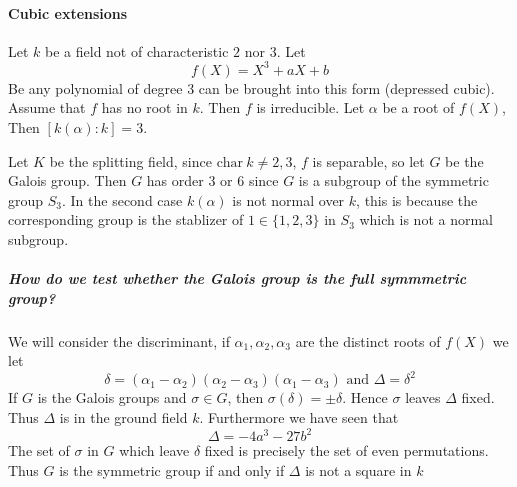   \paragraph*{Cubic extensions}
  \begin{example}
    Let $k$ be a field not of characteristic $2$ nor $3$. Let \[
      f(X) = X^3 + aX +b  
    \]
    Be any polynomial of degree $3$ can be brought into this form (depressed cubic). Assume that $f$ has no root in $k$. Then $f$ is irreducible. Let $\alpha$ be a root of $f(X)$, Then $[k(\alpha)\colon k] = 3$.

    Let $K$ be the splitting field, since $\text{char}~k\neq 2,3$, $f$ is separable, so let $G$ be the Galois group.
    Then $G$ has order $3$ or $6$ since $G$ is a subgroup of the symmetric group $S_3$. 
    In the second case $k(\alpha)$ is not normal over $k$, this is because the corresponding group is the stablizer of $1\in \{1,2,3\}$ in $S_3$ which is not a normal subgroup.%
    
    \subparagraph*{How do we test whether the Galois group is the full symmmetric group?}
    We will consider the discriminant, if $\alpha_1,\alpha_2,\alpha_3$ are the distinct roots of $f(X)$ we let\[
      \delta = (\alpha_1-\alpha_2)(\alpha_2-\alpha_3)(\alpha_1-\alpha_3) \text{ and }\Delta = \delta^2  
    \]
    If $G$ is the Galois groups and $\sigma\in G$, then $\sigma(\delta) = \pm \delta$. Hence $\sigma$ leaves $\Delta$ fixed. Thus $\Delta$ is in the ground field $k$. Furthermore we have seen that \[
      \Delta = -4a^3-27b^2  
    \]
  The set of $\sigma$ in $G$ which leave $\delta$ fixed is precisely the set of even permutations. Thus $G$ is the symmetric group if and only if $\Delta$ is not a square in $k$  
  \end{example}
\printindex

